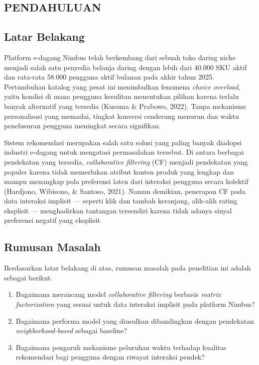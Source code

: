 \documentclass[12pt,a4paper]{report}
\begin{document}
\newpage
{}
\setcounter{page}{1}
\begin{onehalfspace}

\chapter{PENDAHULUAN}

\section{Latar Belakang}
Platform e-dagang Nimbus telah berkembang dari sebuah toko daring niche
menjadi salah satu penyedia belanja daring dengan lebih dari 40.000 SKU
aktif dan rata-rata 58.000 pengguna aktif bulanan pada akhir tahun 2025.
Pertumbuhan katalog yang pesat ini menimbulkan fenomena \emph{choice
overload}, yaitu kondisi di mana pengguna kesulitan menentukan pilihan
karena terlalu banyak alternatif yang tersedia (Kusuma \& Prabowo, 2022).
Tanpa mekanisme personalisasi yang memadai, tingkat konversi cenderung
menurun dan waktu penelusuran pengguna meningkat secara signifikan.

Sistem rekomendasi merupakan salah satu solusi yang paling banyak diadopsi
industri e-dagang untuk mengatasi permasalahan tersebut. Di antara berbagai
pendekatan yang tersedia, \emph{collaborative filtering} (CF) menjadi
pendekatan yang populer karena tidak memerlukan atribut konten produk yang
lengkap dan mampu menangkap pola preferensi laten dari interaksi pengguna
secara kolektif (Hardjono, Wibisono, \& Santoso, 2021). Namun demikian,
penerapan CF pada data interaksi implisit --- seperti klik dan tambah
keranjang, alih-alih rating eksplisit --- menghadirkan tantangan tersendiri
karena tidak adanya sinyal preferensi negatif yang eksplisit.

\section{Rumusan Masalah}
Berdasarkan latar belakang di atas, rumusan masalah pada penelitian ini
adalah sebagai berikut.
\begin{enumerate}
  \item Bagaimana merancang model \emph{collaborative filtering} berbasis
    \emph{matrix factorization} yang sesuai untuk data interaksi implisit
    pada platform Nimbus?
  \item Bagaimana performa model yang diusulkan dibandingkan dengan
    pendekatan \emph{neighborhood-based} sebagai baseline?
  \item Bagaimana pengaruh mekanisme peluruhan waktu terhadap kualitas
    rekomendasi bagi pengguna dengan riwayat interaksi pendek?
\end{enumerate}


\end{onehalfspace}
\end{document}
